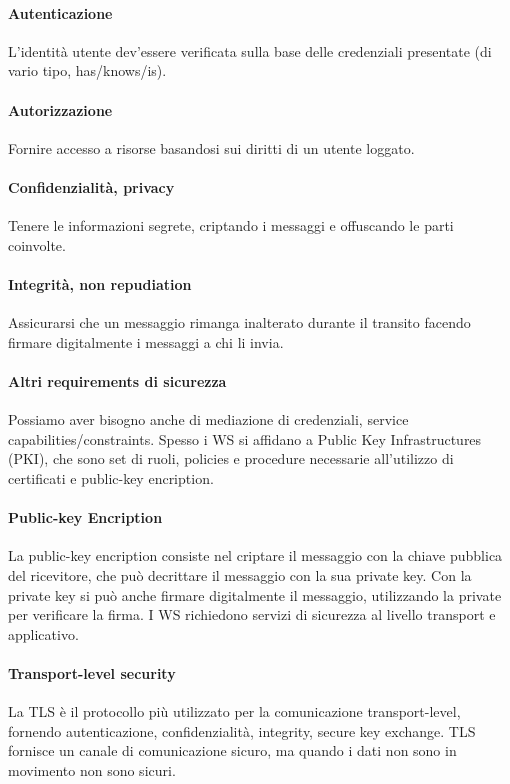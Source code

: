 \documentclass[11pt]{article}
\begin{document}
\paragraph{Autenticazione} L'identità utente dev'essere verificata sulla base delle credenziali presentate (di vario tipo, has/knows/is).
\paragraph{Autorizzazione} Fornire accesso a risorse basandosi sui diritti di un utente loggato. 
\paragraph{Confidenzialità, privacy} Tenere le informazioni segrete, criptando i messaggi e offuscando le parti coinvolte.
\paragraph{Integrità, non repudiation} Assicurarsi che un messaggio rimanga inalterato durante il transito facendo firmare digitalmente i messaggi a chi li invia. 
\paragraph{Altri requirements di sicurezza} Possiamo aver bisogno anche di mediazione di credenziali, service capabilities/constraints. Spesso i WS si affidano a Public Key Infrastructures (PKI), che sono set di ruoli, policies e procedure necessarie all'utilizzo di certificati e public-key encription. 
\paragraph{Public-key Encription} La public-key encription consiste nel criptare il messaggio con la chiave pubblica del ricevitore, che può decrittare il messaggio con la sua private key. Con la private key si può anche firmare digitalmente il messaggio, utilizzando la private per verificare la firma. I WS richiedono servizi di sicurezza al livello transport e applicativo.   
\paragraph{Transport-level security} La TLS è il protocollo più utilizzato per la comunicazione transport-level, fornendo autenticazione, confidenzialità, integrity, secure key exchange. TLS fornisce un canale di comunicazione sicuro, ma quando i dati non sono in movimento non sono sicuri. 
\end{document}
